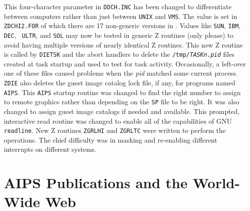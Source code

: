 \begin{description}
 This four-character parameter in {\tt DDCH.INC} has
    been changed to differentiate between computers rather than just
    between {\tt UNIX} and \hbox{{\tt VMS}}.  The value is set in {\tt
    ZDCHI2.FOR} of which there are 17 non-generic versions in
    \hbox{\AIPS}.  Values like {\tt SUN}, {\tt IBM}, {\tt DEC}, {\tt
    ULTR}, and {\tt SOL} may now be tested in generic Z routines (only
    please) to avoid having multiple versions of nearly identical Z
    routines.
 This new Z routine is called by {\tt DIETSK} and the
    abort handlers to delete the {\tt /tmp/{\it TASKn\/}.{\it pid}}
    files created at task startup and used to test for task activity.
    Occasionally, a left-over one of these files caused problems when
    the {\it pid} matched some current process.  {\tt ZDIE} also
    deletes the guest image catalog lock file, if any, for programs
    named \hbox{{\tt AIPS}}.
 This {\tt AIPS} startup routine was changed to find
    the right number to assign to remote graphics rather than
    depending on the {\tt SP} file to be right.  It was also changed
    to assign guest image catalogs if needed and available.
 This prompted, interactive read routine was changed to
    enable all of the capabilities of GNU {\tt readline}.  New Z
    routines {\tt ZGRLHI} and {\tt ZGRLTC} were written to perform the
    operations.  The chief difficulty was in masking and re-enabling
    different interrupts on different systems.
\end{description}

\section{AIPS Publications and the World-Wide Web}

